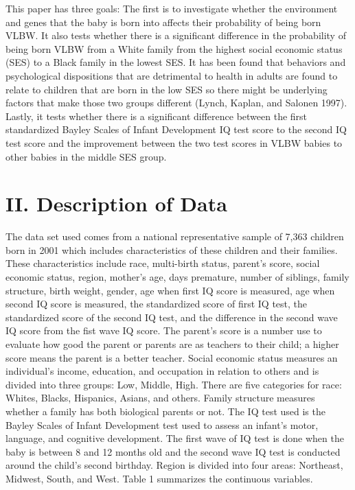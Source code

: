 \documentclass{article}
\begin{document}
This paper has three goals: The first is to investigate whether the environment and genes that the baby is born into affects their probability of being born VLBW. It also tests whether there is a significant difference in the probability of being born VLBW from a White family from the highest social economic status (SES) to a Black family in the lowest SES. It has been found that behaviors and psychological dispositions that are detrimental to health in adults are found to relate to children that are born in the low SES so there might be underlying factors that make those two groups different (Lynch, Kaplan, and Salonen 1997). Lastly, it tests whether there is a significant difference between the first standardized Bayley Scales of Infant Development IQ test score to the second IQ test score and the improvement between the two test scores in VLBW babies to other babies in the middle SES group.


\section*{II. Description of Data}

The data set used comes from a national representative sample of 7,363 children born in 2001 which includes characteristics of these children and their families. These characteristics include race, multi-birth status, parent's score, social economic status, region, mother's age, days premature, number of siblings, family structure, birth weight, gender, age when first IQ score is measured, age when second IQ score is measured, the standardized score of first IQ test, the standardized score of the second IQ test, and the difference in the second wave IQ score from the fist wave IQ score. The parent's score is a number use to evaluate how good the parent or parents are as teachers to their child; a higher score means the parent is a better teacher. Social economic status measures an individual's income, education, and occupation in relation to others and is divided into three groups: Low, Middle, High. There are five categories for race: Whites, Blacks, Hispanics, Asians, and others. Family structure measures whether a family has both biological parents or not. The IQ test used is the Bayley Scales of Infant Development test used to assess an infant's motor, language, and cognitive development. The first wave of IQ test is done when the baby is between 8 and 12 months old and the second wave IQ test is conducted around the child's second birthday. Region is divided into four areas: Northeast, Midwest, South, and West. Table 1 summarizes the continuous variables. 
\end{document}
